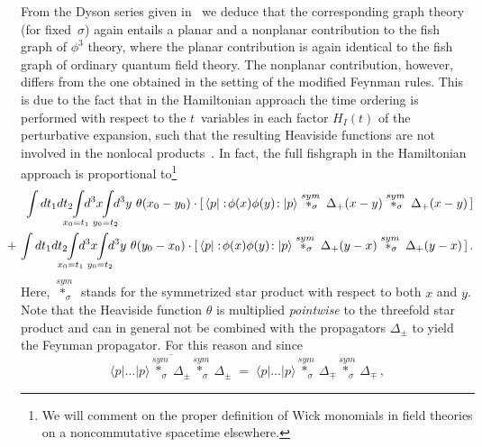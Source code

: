 \documentclass[a4paper,twoside,12pt]{article}
\begin{document}
From the Dyson series given in~\cite{dfr} we deduce that the corresponding
graph theory (for fixed~$\sigma$) again entails a planar and a nonplanar
contribution to the fish graph of $\phi^3$ theory, where the planar
contribution is again identical to the fish graph of ordinary quantum field
theory. The nonplanar contribution, however, differs from the one obtained in
the setting of the modified Feynman rules. This is due to the fact that in the
Hamiltonian approach the time ordering is performed with respect to the 
$t$~variables in each factor $H_I(t)$ of the perturbative expansion, such that the
resulting Heaviside functions are not involved in the nonlocal 
products~\cite[eqn. 6.15]{dfr}.  In fact, the full fishgraph in the Hamiltonian
approach is proportional to\footnote{We will comment on the proper definition
of Wick monomials in field theories on a noncommutative spacetime elsewhere.} 
\begin{eqnarray*} 
&&\hspace{-9pt}
\int dt_1dt_2
\hspace{-8pt}
\int\limits_{x_0=t_1} \hspace{-8pt} d^3x 
\hspace{-8pt}
\int\limits_{y_0=t_2} \hspace{-8pt}d^3y 
\,\,\theta(x_0-y_0)\cdot[\,
\langle p|:\! \phi(x)\phi(y)\!:|p\rangle
\stackrel{sym\;}{*_\sigma}\Delta_+(x-y)
\stackrel{sym\;}{*_\sigma}\Delta_+(x-y)\,]
\\
&&\hspace{-22pt}
+\,\int dt_1dt_2
\hspace{-8pt}
\int\limits_{x_0=t_1} \hspace{-8pt} d^3x 
\hspace{-8pt}
\int\limits_{ y_0=t_2} \hspace{-8pt}d^3y 
\,\,\theta(y_0-x_0)\cdot[\,
\langle p|:\! \phi(x)\phi(y)\!: |p\rangle
\stackrel{sym\;}{*_\sigma}\Delta_+(y-x)
\stackrel{sym\;}{*_\sigma}\Delta_+(y-x)\,]\,.
\end{eqnarray*} 
Here, $\stackrel{sym\;}{*_\sigma}$ stands for the symmetrized star product
with respect to both $x$ and $y$. Note that the Heaviside function $\theta$ is
multiplied {\sl pointwise} to the threefold star product and can in general
not be combined with the propagators $\Delta_\pm$ to yield the Feynman
propagator. For this reason and since 
\vspace{-10pt}$$
\overline{\langle p|\dots |p\rangle \stackrel{sym\;}{*_\sigma}
\Delta_\pm\stackrel{sym\;}{*_\sigma}\Delta_\pm}
\;=\;\langle p|\dots |p\rangle \stackrel{sym\;}{*_\sigma}\Delta_\mp
\stackrel{sym\;}{*_\sigma}\Delta_\mp\,,
$$
\end{document}
